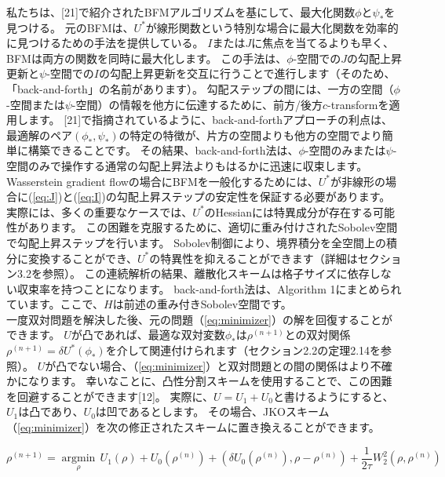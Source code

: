 \documentclass{jsarticle}
\theoremstyle{definition}
\begin{document}
私たちは、[21]で紹介されたBFMアルゴリズムを基にして、最大化関数$\phi$と$\psi_*$を見つける。
元のBFMは、$U^*$が線形関数という特別な場合に最大化関数を効率的に見つけるための手法を提供している。
$I$または$J$に焦点を当てるよりも早く、BFMは両方の関数を同時に最大化します。
この手法は、$\phi$-空間での$J$の勾配上昇更新と$\psi$-空間での$I$の勾配上昇更新を交互に行うことで進行します（そのため、「back-and-forth」の名前があります）。
勾配ステップの間には、一方の空間（$\phi$-空間または$\psi$-空間）の情報を他方に伝達するために、前方/後方$c$-transformを適用します。
[21]で指摘されているように、back-and-forthアプローチの利点は、最適解のペア$(\phi_*, \psi_*)$の特定の特徴が、片方の空間よりも他方の空間でより簡単に構築できることです。
その結果、back-and-forth法は、$\phi$-空間のみまたは$\psi$-空間のみで操作する通常の勾配上昇法よりもはるかに迅速に収束します。\\

Wasserstein gradient flowの場合にBFMを一般化するためには、$U^*$が非線形の場合に(\ref{eq:J})と(\ref{eq:I})の勾配上昇ステップの安定性を保証する必要があります。
実際には、多くの重要なケースでは、$U^*$のHessianには特異成分が存在する可能性があります。
この困難を克服するために、適切に重み付けされたSobolev空間で勾配上昇ステップを行います。
Sobolev制御により、境界積分を全空間上の積分に変換することができ、$U^*$の特異性を抑えることができます（詳細はセクション3.2を参照）。
この連続解析の結果、離散化スキームは格子サイズに依存しない収束率を持つことになります。
back-and-forth法は、Algorithm 1にまとめられています。ここで、$H$は前述の重み付きSobolev空間です。\\

一度双対問題を解決した後、元の問題（\ref{eq:minimizer}）の解を回復することができます。
$U$が凸であれば、最適な双対変数$\phi_*$は$\rho^{(n+1)}$との双対関係$\rho^{(n+1)} = \delta U^*(\phi_*)$を介して関連付けられます（セクション2.2の定理2.14を参照）。
$U$が凸でない場合、（\ref{eq:minimizer}）と双対問題との間の関係はより不確かになります。
幸いなことに、凸性分割スキームを使用することで、この困難を回避することができます[12]。
実際に、$U = U_1 + U_0$と書けるようにすると、$U_1$は凸であり、$U_0$は凹であるとします。
その場合、JKOスキーム（\ref{eq:minimizer}）を次の修正されたスキームに置き換えることができます。

\begin{equation}
    \label{eq:JKO}
    \rho^{(n+1)} = \underset{\rho}{\operatorname{argmin}} \, U_1(\rho) + U_0(\rho^{(n)}) + (\delta U_0(\rho^{(n)}), \rho - \rho^{(n)}) + \frac{1}{2 \tau} W^2_2(\rho, \rho^{(n)})
\end{equation}
\end{document}
